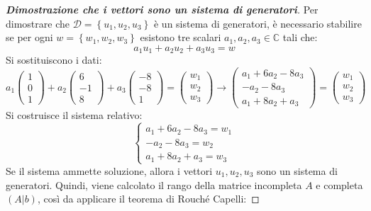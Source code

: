 \documentclass[a4paper]{article}
\begin{document}
	\begin{proof}[\textbf{Dimostrazione che i vettori sono un sistema di generatori}]
		Per dimostrare che $\mathscr{D} = \left\{u_{1}, u_{2}, u_{3}\right\}$ è un sistema di generatori, è necessario stabilire se per ogni $w = \left\{w_{1}, w_{2}, w_{3}\right\}$ esistono tre scalari $a_{1}, a_{2}, a_{3} \in \mathbb{C}$ tali che:
		\begin{equation*}
			a_{1}u_{1} + a_{2}u_{2} + a_{3}u_{3} = w
		\end{equation*}
		Si sostituiscono i dati:
		\begin{equation*}
			a_{1}\begin{pmatrix}
				1 \\ 0 \\ 1
			\end{pmatrix} +
			a_{2}\begin{pmatrix}
				6 \\ -1 \\ 8
			\end{pmatrix} +
			a_{3}\begin{pmatrix}
				-8 \\ -8 \\ 1
			\end{pmatrix} =
			\begin{pmatrix}
				w_{1} \\ w_{2} \\ w_{3}
			\end{pmatrix} \longrightarrow
			\begin{pmatrix}
				a_{1} + 6a_{2} - 8a_{3} \\
				-a_{2} - 8a_{3} \\
				a_{1} + 8a_{2} + a_{3}
			\end{pmatrix} =
			\begin{pmatrix}
				w_{1} \\ w_{2} \\ w_{3}
			\end{pmatrix}
		\end{equation*}
		Si costruisce il sistema relativo:
		\begin{equation*}
			\begin{cases}
				a_{1} + 6a_{2} - 8a_{3} = w_{1} \\
				-a_{2} - 8a_{3} = w_{2} \\
				a_{1} + 8a_{2} + a_{3} = w_{3}
			\end{cases}
		\end{equation*}
		Se il sistema ammette soluzione, allora i vettori $u_{1}, u_{2}, u_{3}$ sono un sistema di generatori. Quindi, viene calcolato il rango della matrice incompleta $A$ e completa $\left(A|b\right)$, così da applicare il teorema di Rouché Capelli:

\end{proof}
\end{document}
